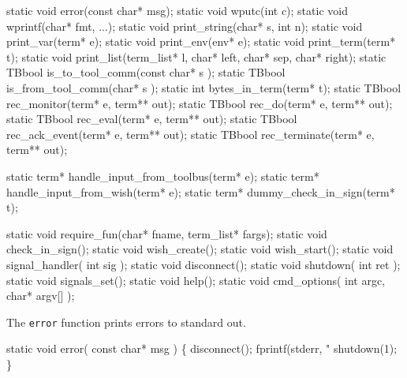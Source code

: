 \nwenddocs{}\endmoddef\nwstartdeflinemarkup{}\nwenddeflinemarkup
static void error(const char* msg);
static void wputc(int c);
static void wprintf(char* fmt, ...);
static void print_string(char* s, int n);
static void print_var(term* e);
static void print_env(env* e);
static void print_term(term* t);
static void print_list(term_list* l, char* left, char* sep, char* right);
static TBbool is_to_tool_comm(const char* s );
static TBbool is_from_tool_comm(char* s );
static int bytes_in_term(term* t);
static TBbool rec_monitor(term* e, term** out);
static TBbool rec_do(term* e, term** out);
static TBbool rec_eval(term* e, term** out);
static TBbool rec_ack_event(term* e, term** out);
static TBbool rec_terminate(term* e, term** out);

static term*  handle_input_from_toolbus(term* e);
static term*  handle_input_from_wish(term* e);
static term*  dummy_check_in_sign(term* t);

static void require_fun(char* fname, term_list* fargs);
static void check_in_sign();
static void wish_create();
static void wish_start();
static void signal_handler( int sig );
static void disconnect();
static void shutdown( int ret );
static void signals_set();
static void help();
static void cmd_options( int argc, char* argv[] );
\nwendcode{}\nwdocspar



The {\tt error} function prints errors to standard out.

\nwenddocs{}\endmoddef\let\nwnotused=\nwoutput{}\nwstartdeflinemarkup{}\nwenddeflinemarkup
static void error( const char* msg )
\{
   disconnect();
   fprintf(stderr, "%
   shutdown(1);
\}
\nwendcode{}\nwdocspar


